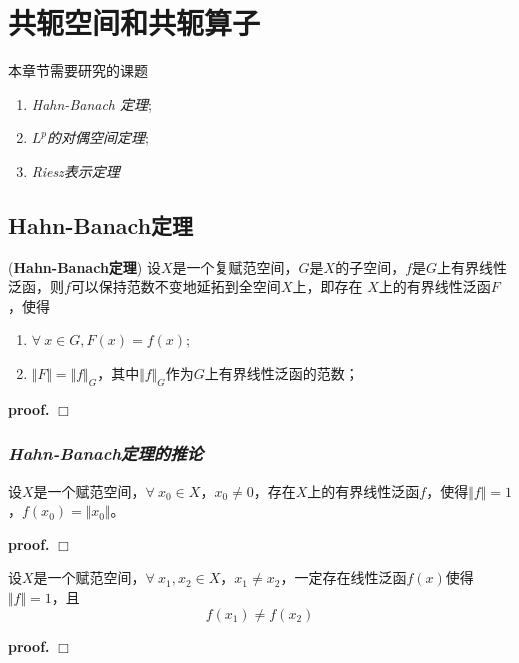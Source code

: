 \chapter{共轭空间和共轭算子}

本章节需要研究的课题
\begin{enumerate}[itemindent=2em]
    \item \textsl{Hahn-Banach 定理};
    \item \textsl{$L^p$的对偶空间定理};
    \item \textsl{{Riesz}表示定理}
\end{enumerate}

\section{Hahn-Banach定理}

\begin{mdframed}
    \begin{theorem}
        (\textbf{Hahn-Banach定理}) 设$X$是一个复赋范空间，$G$是$X$的子空间，$f$是$G$上有界线性泛函，则$f$可以保持范数不变地延拓到全空间$X$上，即存在
        $X$上的有界线性泛函$F$，使得
        \begin{enumerate}[itemindent=2em]
            \item $\forall\ x\in G,F(x)=f(x)$;
            \item $\Vert F\Vert=\Vert f\Vert_G$，其中$\Vert f\Vert_G$作为$G$上有界线性泛函的范数；
        \end{enumerate}
    \end{theorem}
\end{mdframed}
\textbf{proof.} $\Box$

\subsection*{\textsl{Hahn-Banach定理的推论}}

\begin{mdframed}
    \begin{proposition}
        设$X$是一个赋范空间，$\forall\ x_0\in X$，$x_0\neq 0$，存在$X$上的有界线性泛函$f$，使得$\Vert f\Vert=1$，$f(x_0)=\Vert x_0\Vert$。
    \end{proposition}
\end{mdframed}
\textbf{proof.} $\Box$

\begin{mdframed}
    \begin{corollary}
       设$X$是一个赋范空间，$\forall\ x_1,x_2\in X$，$x_1\neq x_2$，一定存在线性泛函$f(x)$使得$\Vert f\Vert=1$，且
       \begin{equation}
        f(x_1)\neq f(x_2)
       \end{equation}
    \end{corollary}
\end{mdframed}
\textbf{proof.} $\Box$

